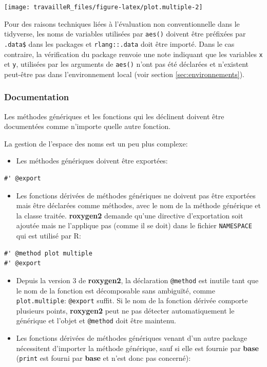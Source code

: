 \documentclass[
  12pt,
  french,
  a4paper,
  extrafontsizes,onecolumn,openright
  ]{memoir}
\providecommand{\tightlist}{%
  \setlength{\itemsep}{0pt}\setlength{\parskip}{0pt}}
\begin{document}
\begin{center}\texttt{[image: travailleR\_files/figure-latex/plot.multiple-2]} \end{center}

\normalsize

Pour des raisons techniques liées à l'évaluation non conventionnelle dans le tidyverse, les noms de variables utilisées par \texttt{aes()} doivent être préfixées par \texttt{.data\$} dans les packages et \texttt{rlang::.data} doit être importé.
Dans le cas contraire, la vérification du package renvoie une note indiquant que les variables \texttt{x} et \texttt{y}, utilisées par les arguments de \texttt{aes()} n'ont pas été déclarées et n'existent peut-être pas dans l'environnement local (voir section \ref{sec:environnements}).

\subsubsection{Documentation}\label{documentation}

Les méthodes génériques et les fonctions qui les déclinent doivent être documentées comme n'importe quelle autre fonction.

La gestion de l'espace des noms est un peu plus complexe:

\begin{itemize}
\tightlist
\item
  Les méthodes génériques doivent être exportées:
\end{itemize}

\begin{verbatim}
#' @export
\end{verbatim}

\begin{itemize}
\tightlist
\item
  Les fonctions dérivées de méthodes génériques ne doivent pas être exportées mais être déclarées comme méthodes, avec le nom de la méthode générique et la classe traitée.
  \textbf{roxygen2} demande qu'une directive d'exportation soit ajoutée mais ne l'applique pas (comme il se doit) dans le fichier \texttt{NAMESPACE} qui est utilisé par R:
\end{itemize}

\begin{verbatim}
#' @method plot multiple
#' @export
\end{verbatim}

\begin{itemize}
\tightlist
\item
  Depuis la version 3 de \textbf{roxygen2}, la déclaration \texttt{@method} est inutile tant que le nom de la fonction est décomposable sans ambiguïté, comme \texttt{plot.multiple}: \texttt{@export} suffit.
  Si le nom de la fonction dérivée comporte plusieurs points, \textbf{roxygen2} peut ne pas détecter automatiquement le générique et l'objet et \texttt{@method} doit être maintenu.
\item
  Les fonctions dérivées de méthodes génériques venant d'un autre package nécessitent d'importer la méthode générique, sauf si elle est fournie par \textbf{base} (\texttt{print} est fourni par \textbf{base} et n'est donc pas concerné):
\end{itemize}
\end{document}
